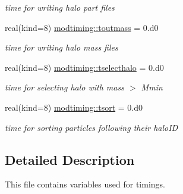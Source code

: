 \begin{DoxyCompactItemize}
\begin{DoxyCompactList}\small\item\em time for writing halo part files \end{DoxyCompactList}\item 
real(kind=8) \hyperlink{namespacemodtiming_a03a912e0243fcfbdec3ceeae3a34963a}{modtiming\+::toutmass} = 0.d0
\begin{DoxyCompactList}\small\item\em time for writing halo mass files \end{DoxyCompactList}\item 
real(kind=8) \hyperlink{namespacemodtiming_a0e46279061d4681c9c8b5a055410f04b}{modtiming\+::tselecthalo} = 0.d0
\begin{DoxyCompactList}\small\item\em time for selecting halo with mass $>$ Mmin \end{DoxyCompactList}\item 
real(kind=8) \hyperlink{namespacemodtiming_a32142e111b00eb8590746eef1b1d9dd6}{modtiming\+::tsort} = 0.d0
\begin{DoxyCompactList}\small\item\em time for sorting particles following their halo\+ID \end{DoxyCompactList}\end{DoxyCompactItemize}


\subsection{Detailed Description}
This file contains variables used for timings. 

